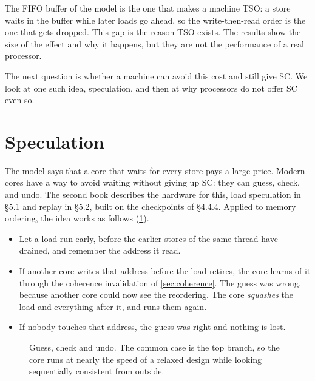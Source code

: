 The FIFO buffer of the model is the one that makes a machine TSO: a store waits in the buffer while later loads go ahead, so the write-then-read order is the one that gets dropped. This gap is the reason TSO exists. The results show the size of the effect and why it happens, but they are not the performance of a real processor.

The next question is whether a machine can avoid this cost and still give SC. We look at one such idea, speculation, and then at why processors do not offer SC even so.

\section{Speculation}
\label{sec:spec}

The model says that a core that waits for every store pays a large price. Modern cores have a way to avoid waiting without giving up SC: they can guess, check, and undo. The second book describes the hardware for this, load speculation in \S5.1 and replay in \S5.2, built on the checkpoints of \S4.4.4\cite{sarangiNextGen}. Applied to memory ordering, the idea works as follows (\cref{fig:spec}).
\begin{itemize}
\item Let a load run early, before the earlier stores of the same thread have drained, and remember the address it read.
\item If another core writes that address before the load retires, the core learns of it through the coherence invalidation of \cref{sec:coherence}. The guess was wrong, because another core could now see the reordering. The core \emph{squashes} the load and everything after it, and runs them again.
\item If nobody touches that address, the guess was right and nothing is lost.
\end{itemize}

\begin{figure}[!htbp]
\centering
{}
\caption{Guess, check and undo. The common case is the top branch, so the core runs at nearly the speed of a relaxed design while looking sequentially consistent from outside.}
\label{fig:spec}
\end{figure}


